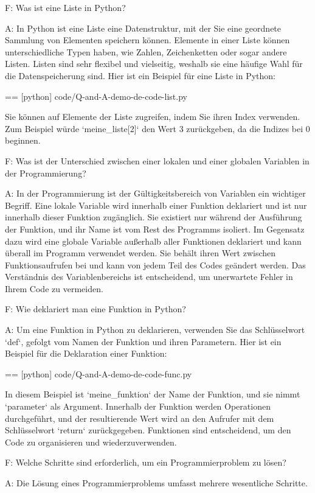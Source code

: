F:
  Was ist eine Liste in Python?

A:
  In Python ist eine Liste eine Datenstruktur, mit der Sie eine geordnete Sammlung von Elementen speichern können. Elemente in einer Liste können unterschiedliche Typen haben, wie Zahlen, Zeichenketten oder sogar andere Listen. Listen sind sehr flexibel und vielseitig, weshalb sie eine häufige Wahl für die Datenspeicherung sind. Hier ist ein Beispiel für eine Liste in Python:

  == [python] {code/Q-and-A-demo-de-code-list.py}

  Sie können auf Elemente der Liste zugreifen, indem Sie ihren Index verwenden. Zum Beispiel würde `meine\_liste[2]` den Wert 3 zurückgeben, da die Indizes bei 0 beginnen.

F:
  Was ist der Unterschied zwischen einer lokalen und einer globalen Variablen in der Programmierung?

A:
  In der Programmierung ist der Gültigkeitsbereich von Variablen ein wichtiger Begriff. Eine lokale Variable wird innerhalb einer Funktion deklariert und ist nur innerhalb dieser Funktion zugänglich. Sie existiert nur während der Ausführung der Funktion, und ihr Name ist vom Rest des Programms isoliert. Im Gegensatz dazu wird eine globale Variable außerhalb aller Funktionen deklariert und kann überall im Programm verwendet werden. Sie behält ihren Wert zwischen Funktionsaufrufen bei und kann von jedem Teil des Codes geändert werden. Das Verständnis des Variablenbereichs ist entscheidend, um unerwartete Fehler in Ihrem Code zu vermeiden.

F:
  Wie deklariert man eine Funktion in Python?

A:
  Um eine Funktion in Python zu deklarieren, verwenden Sie das Schlüsselwort `def`, gefolgt vom Namen der Funktion und ihren Parametern. Hier ist ein Beispiel für die Deklaration einer Funktion:

  == [python] {code/Q-and-A-demo-de-code-func.py}

  In diesem Beispiel ist `meine\_funktion` der Name der Funktion, und sie nimmt `parameter` als Argument. Innerhalb der Funktion werden Operationen durchgeführt, und der resultierende Wert wird an den Aufrufer mit dem Schlüsselwort `return` zurückgegeben. Funktionen sind entscheidend, um den Code zu organisieren und wiederzuverwenden.

F:
  Welche Schritte sind erforderlich, um ein Programmierproblem zu lösen?

A:
  Die Lösung eines Programmierproblems umfasst mehrere wesentliche Schritte.

